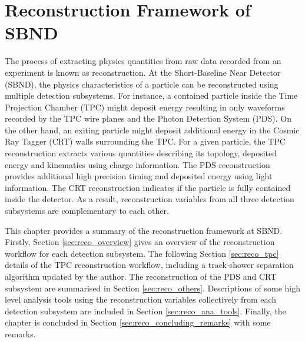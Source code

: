 
\chapter{Reconstruction Framework of SBND}
\label{ChapterReco}

\ifpdf
    \graphicspath{{Chapter6/Figs/Raster/}{Chapter6/Figs/PDF/}{Chapter6/Figs/}}
\else
    \graphicspath{{Chapter6/Figs/Vector/}{Chapter6/Figs/}}
\fi


The process of extracting physics quantities from raw data recorded from an experiment is known as reconstruction.
At the Short-Baseline Near Detector (SBND), the physics characteristics of a particle can be reconstructed using multiple detection subsystems. 
For instance, a contained particle inside the Time Projection Chamber (TPC) might deposit energy resulting in only waveforms recorded by the TPC wire planes and the Photon Detection System (PDS).
On the other hand, an exiting particle might deposit additional energy in the Cosmic Ray Tagger (CRT) walls surrounding the TPC.
For a given particle, the TPC reconstruction extracts various quantities describing its topology, deposited energy and kinematics using charge information.
The PDS reconstruction provides additional high precision timing and deposited energy using light information.
The CRT reconstruction indicates if the particle is fully contained inside the detector.
As a result, reconstruction variables from all three detection subsystems are complementary to each other. 

This chapter provides a summary of the reconstruction framework at SBND.
Firstly, Section \ref{sec:reco_overview} gives an overview of the reconstruction workflow for each detection subsystem. 
The following Section \ref{sec:reco_tpc} details of the TPC reconstruction workflow, including a track-shower separation algorithm updated by the author.
The reconstruction of the PDS and CRT subsystem are summarised in Section \ref{sec:reco_others}.
Descriptions of some high level analysis tools using the reconstruction variables collectively from each detection subsystem are included in Section \ref{sec:reco_ana_tools}.                 
Finally, the chapter is concluded in Section \ref{sec:reco_concluding_remarks} with some remarks.

